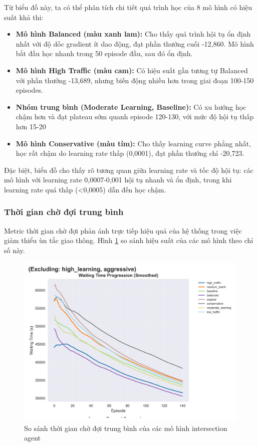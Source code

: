 Từ biểu đồ này, ta có thể phân tích chi tiết quá trình học của 8 mô hình có hiệu suất khả thi:

\begin{itemize}
    \item \textbf{Mô hình Balanced (màu xanh lam):} Cho thấy quá trình hội tụ ổn định nhất với độ dốc gradient ít dao động, đạt phần thưởng cuối -12,860. Mô hình bắt đầu học nhanh trong 50 episode đầu, sau đó ổn định.
    
    \item \textbf{Mô hình High Traffic (màu cam):} Có hiệu suất gần tương tự Balanced với phần thưởng -13,689, nhưng biến động nhiều hơn trong giai đoạn 100-150 episodes.
    
    \item \textbf{Nhóm trung bình (Moderate Learning, Baseline):} Có xu hướng học chậm hơn và đạt plateau sớm quanh episode 120-130, với mức độ hội tụ thấp hơn 15-20%
    
    \item \textbf{Mô hình Conservative (màu tím):} Cho thấy learning curve phẳng nhất, học rất chậm do learning rate thấp (0,0001), đạt phần thưởng chỉ -20,723.
\end{itemize}

Đặc biệt, biểu đồ cho thấy rõ tương quan giữa learning rate và tốc độ hội tụ: các mô hình với learning rate 0,0007-0,001 hội tụ nhanh và ổn định, trong khi learning rate quá thấp (<0,0005) dẫn đến học chậm.

\subsubsection{Thời gian chờ đợi trung bình}
Metric thời gian chờ đợi phản ánh trực tiếp hiệu quả của hệ thống trong việc giảm thiểu ùn tắc giao thông. Hình \ref{fig:intersection_filtered_waiting_time} so sánh hiệu suất của các mô hình theo chỉ số này.

\begin{figure}[!htp]
    \centering
    \includegraphics[width=\textwidth]{figures/individual_plots/intersection_filtered_waiting_time.png}
    \caption{So sánh thời gian chờ đợi trung bình của các mô hình intersection agent}
    \label{fig:intersection_filtered_waiting_time}
\end{figure}

